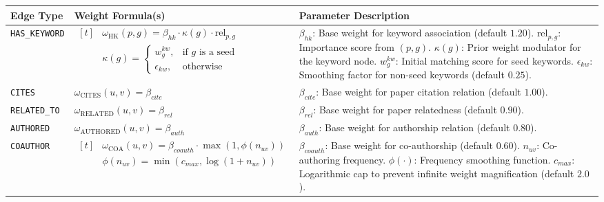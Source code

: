 \documentclass{llmxive}
\providecommand{\arraystretch}{1.}
\begin{document}
\begin{table}[!t]
\small
\centering
\renewcommand{\arraystretch}{1.}
\begin{tabular}{@{} l| p{6cm} p{7cm} @{}}
\toprule
\textbf{Edge Type} & \textbf{Weight Formula(s)} & \textbf{Parameter Description} \\ 
\midrule
\texttt{HAS\_KEYWORD} & 
$\begin{aligned}[t]
&\omega_{\text{HK}}(p,g) = \beta_{hk} \cdot \kappa(g) \cdot \text{rel}_{p,g} \\
&\kappa(g) = \begin{cases} 
w_g^{kw}, &\text{if } g \text{ is a seed} \\ 
\epsilon_{kw}, &\text{otherwise} 
\end{cases}
\end{aligned}$ & 
$\beta_{hk}$: Base weight for keyword association (default $1.20$). \newline
$\text{rel}_{p,g}$: Importance score from $(p,g)$. \newline
$\kappa(g)$: Prior weight modulator for the keyword node. \newline
$w_g^{kw}$: Initial matching score for seed keywords. \newline
$\epsilon_{kw}$: Smoothing factor for non-seed keywords (default $0.25$). \\
\midrule
\texttt{CITES} & 
$\omega_{\text{CITES}}(u,v) = \beta_{cite}$ & 
$\beta_{cite}$: Base weight for paper citation relation (default $1.00$). \\
\midrule
\texttt{RELATED\_TO} & 
$\omega_{\text{RELATED}}(u,v) = \beta_{rel}$ & 
$\beta_{rel}$: Base weight for paper relatedness (default $0.90$). \\
\midrule
\texttt{AUTHORED} & 
$\omega_{\text{AUTHORED}}(u,v) = \beta_{auth}$ & 
$\beta_{auth}$: Base weight for authorship relation (default $0.80$). \\
\midrule
\texttt{COAUTHOR} & 
$\begin{aligned}[t]
&\omega_{\text{COA}}(u,v) = \beta_{coauth} \cdot \max(1, \phi(n_{uv})) \\
&\phi(n_{uv}) = \min(c_{max}, \log(1+n_{uv}))
\end{aligned}$ & 
$\beta_{coauth}$: Base weight for co-authorship (default $0.60$). \newline
$n_{uv}$: Co-authoring frequency. \newline
$\phi(\cdot)$: Frequency smoothing function. \newline
$c_{max}$: Logarithmic cap to prevent infinite weight magnification (default $2.0$). \\

\end{tabular}
\end{table}
\end{document}
